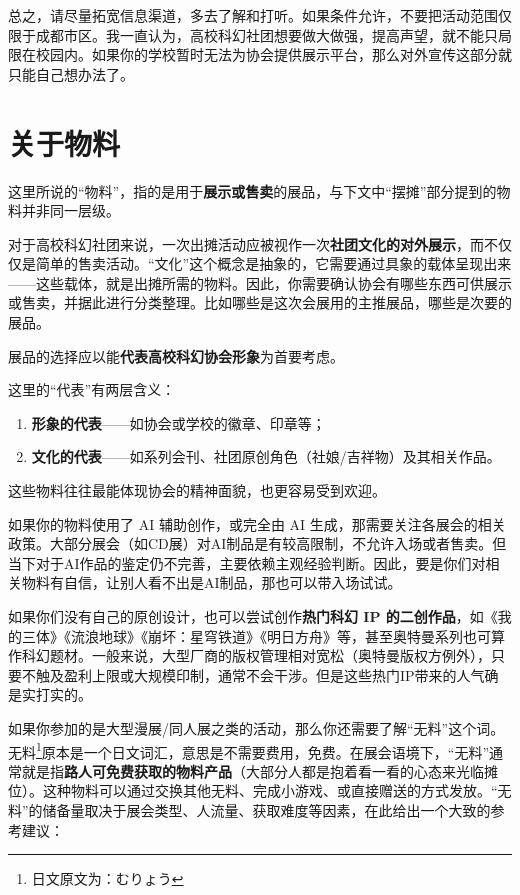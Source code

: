总之，请尽量拓宽信息渠道，多去了解和打听。如果条件允许，不要把活动范围仅限于成都市区。我一直认为，高校科幻社团想要做大做强，提高声望，就不能只局限在校园内。如果你的学校暂时无法为协会提供展示平台，那么对外宣传这部分就只能自己想办法了。

\section{关于物料}\label{ux5173ux4e8eux7269ux6599}

这里所说的``物料''，指的是用于\textbf{展示或售卖}的展品，与下文中``摆摊''部分提到的物料并非同一层级。

对于高校科幻社团来说，一次出摊活动应被视作一次\textbf{社团文化的对外展示}，而不仅仅是简单的售卖活动。``文化''这个概念是抽象的，它需要通过具象的载体呈现出来------这些载体，就是出摊所需的物料。因此，你需要确认协会有哪些东西可供展示或售卖，并据此进行分类整理。比如哪些是这次会展用的主推展品，哪些是次要的展品。

展品的选择应以能\textbf{代表高校科幻协会形象}为首要考虑。

这里的``代表''有两层含义：

\begin{enumerate}
\def\labelenumi{\arabic{enumi}.}
\tightlist
\item
  \textbf{形象的代表}------如协会或学校的徽章、印章等；
\item
  \textbf{文化的代表}------如系列会刊、社团原创角色（社娘/吉祥物）及其相关作品。
\end{enumerate}

这些物料往往最能体现协会的精神面貌，也更容易受到欢迎。

如果你的物料使用了 AI 辅助创作，或完全由 AI
生成，那需要关注各展会的相关政策。大部分展会（如CD展）对AI制品是有较高限制，不允许入场或者售卖。但当下对于AI作品的鉴定仍不完善，主要依赖主观经验判断。因此，要是你们对相关物料有自信，让别人看不出是AI制品，那也可以带入场试试。

如果你们没有自己的原创设计，也可以尝试创作\textbf{热门科幻 IP
的二创作品}，如《我的三体》《流浪地球》《崩坏：星穹铁道》《明日方舟》等，甚至奥特曼系列也可算作科幻题材。一般来说，大型厂商的版权管理相对宽松（奥特曼版权方例外），只要不触及盈利上限或大规模印制，通常不会干涉。但是这些热门IP带来的人气确是实打实的。

如果你参加的是大型漫展/同人展之类的活动，那么你还需要了解``无料''这个词。无料\footnote{日文原文为：むりょう}原本是一个日文词汇，意思是不需要费用，免费。在展会语境下，``无料''通常就是指\textbf{路人可免费获取的物料产品}（大部分人都是抱着看一看的心态来光临摊位）。这种物料可以通过交换其他无料、完成小游戏、或直接赠送的方式发放。``无料''的储备量取决于展会类型、人流量、获取难度等因素，在此给出一个大致的参考建议：

